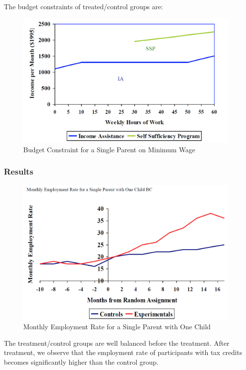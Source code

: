                 The budget constraints of treated/control groups are:
                
                \begin{figure}[H]
                    \centering
                    \includegraphics[width=4.5in]{images/ch13/13_SSP_1.png}
                    \caption{Budget Constraint for a Single Parent on Minimum Wage}
                \end{figure}

            \subsubsection{Results}

                \begin{figure}[H]
                    \centering
                    \includegraphics[width=4.5in]{images/ch13/13_SSP_2.png}
                    \caption{Monthly Employment Rate for a Single Parent with One Child}
                \end{figure}

                The treatment/control groups are well balanced before the treatment. After treatment, we observe that the employment rate of participants with tax credits becomes significantly higher than the control group.

